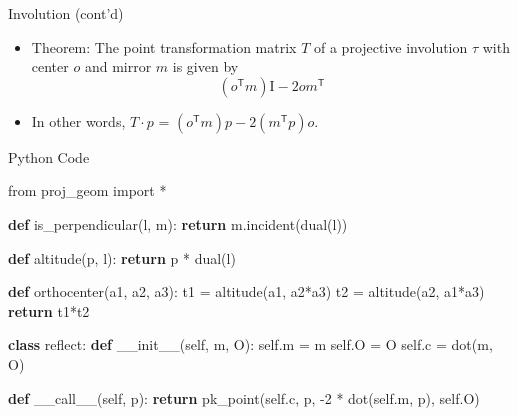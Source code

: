 \documentclass[10pt,ignorenonframetext,serif,onlymath]{beamer}
\newenvironment{Shaded}{}{}
\newcommand{\ControlFlowTok}[1]{\textcolor[rgb]{0.00,0.44,0.13}{\textbf{#1}}}
\newcommand{\DecValTok}[1]{\textcolor[rgb]{0.25,0.63,0.44}{#1}}
\newcommand{\FunctionTok}[1]{\textcolor[rgb]{0.02,0.16,0.49}{#1}}
\newcommand{\ImportTok}[1]{#1}
\newcommand{\KeywordTok}[1]{\textcolor[rgb]{0.00,0.44,0.13}{\textbf{#1}}}
\newcommand{\NormalTok}[1]{#1}
\newcommand{\OperatorTok}[1]{\textcolor[rgb]{0.40,0.40,0.40}{#1}}
\newcommand{\VariableTok}[1]{\textcolor[rgb]{0.10,0.09,0.49}{#1}}
\begin{document}
\begin{frame}{Involution (cont’d)}
\protect\hypertarget{sec:involution-contd}{}

\begin{itemize}
\item
  Theorem: The point transformation matrix \(T\) of a projective
  involution \(\tau\) with center \(o\) and mirror \(m\) is given by
  \[ (o^\mathsf{T} m) \mathrm{I} - 2 o m^\mathsf{T}\]
\item
  In other words, \(T\cdot p\) =
  \((o^\mathsf{T} m) p - 2 (m^\mathsf{T} p) o\).
\end{itemize}

\end{frame}

\begin{frame}[fragile]{Python Code}
\protect\hypertarget{sec:python-code}{}

\scriptsize

\begin{Shaded}
\begin{Highlighting}[]
\ImportTok{from}\NormalTok{ proj_geom }\ImportTok{import} \OperatorTok{*}

\KeywordTok{def}\NormalTok{ is_perpendicular(l, m):}
    \ControlFlowTok{return}\NormalTok{ m.incident(dual(l))}

\KeywordTok{def}\NormalTok{ altitude(p, l):}
    \ControlFlowTok{return}\NormalTok{ p }\OperatorTok{*}\NormalTok{ dual(l)}

\KeywordTok{def}\NormalTok{ orthocenter(a1, a2, a3):}
\NormalTok{    t1 }\OperatorTok{=}\NormalTok{ altitude(a1, a2}\OperatorTok{*}\NormalTok{a3)}
\NormalTok{    t2 }\OperatorTok{=}\NormalTok{ altitude(a2, a1}\OperatorTok{*}\NormalTok{a3)}
    \ControlFlowTok{return}\NormalTok{ t1}\OperatorTok{*}\NormalTok{t2}

\KeywordTok{class}\NormalTok{ reflect:}
    \KeywordTok{def} \FunctionTok{__init__}\NormalTok{(}\VariableTok{self}\NormalTok{, m, O):}
        \VariableTok{self}\NormalTok{.m }\OperatorTok{=}\NormalTok{ m}
        \VariableTok{self}\NormalTok{.O }\OperatorTok{=}\NormalTok{ O}
        \VariableTok{self}\NormalTok{.c }\OperatorTok{=}\NormalTok{ dot(m, O)}

    \KeywordTok{def} \FunctionTok{__call__}\NormalTok{(}\VariableTok{self}\NormalTok{, p):}
        \ControlFlowTok{return}\NormalTok{ pk_point(}\VariableTok{self}\NormalTok{.c, p, }\DecValTok{-2} \OperatorTok{*}\NormalTok{ dot(}\VariableTok{self}\NormalTok{.m, p), }\VariableTok{self}\NormalTok{.O)}
\end{Highlighting}
\end{Shaded}

\end{frame}
\end{document}
